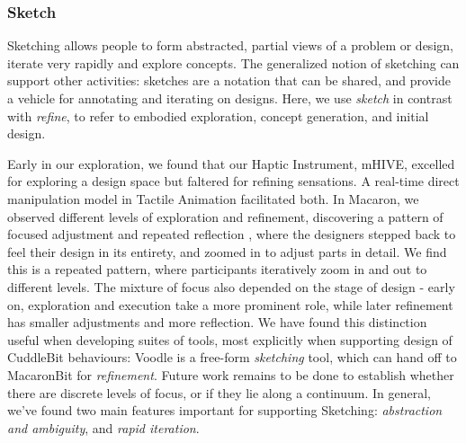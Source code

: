 %
%
\subsubsection{Sketch}
Sketching allows people to form abstracted, partial views of a problem or design, iterate very rapidly and explore concepts.
The generalized notion of sketching can support other activities: sketches are a notation that can be shared, and provide a vehicle for annotating and iterating on designs.
Here, we use \emph{sketch} in contrast with \emph{refine}, to refer to embodied exploration, concept generation, and initial design.

Early in our exploration, we found that our Haptic Instrument, mHIVE, excelled for exploring a design space but faltered for refining sensations.
A real-time direct manipulation model in Tactile Animation facilitated both.
In Macaron, we observed different levels of exploration and refinement, discovering a pattern of focused adjustment and repeated reflection \cite{Schon1982}, where the designers stepped back to feel their design in its entirety, and zoomed in to adjust parts in detail.
We find this is a repeated pattern, where participants iteratively zoom in and out to different levels.
The mixture of focus also depended on the stage of design - early on, exploration and execution take a more prominent role, while later refinement has smaller adjustments and more reflection.
We have found this distinction useful when developing suites of tools, most explicitly when supporting design of CuddleBit behaviours: 
Voodle is a free-form \emph{sketching} tool, which can hand off to MacaronBit for \emph{refinement}.
Future work remains to be done to establish whether there are discrete levels of focus, or if they lie along a continuum.
In general, we've found two main features important for supporting Sketching: \textit{abstraction and ambiguity}, and \textit{rapid iteration}.



%


